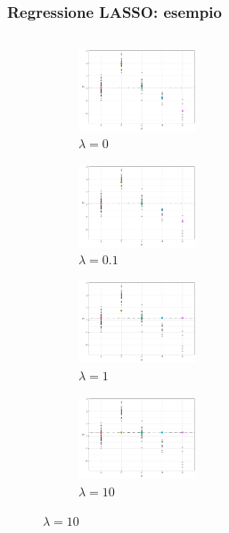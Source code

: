 \documentclass[pdf, aspectratio=169, xcolor=dvipsnames]{beamer}\usepackage[]{graphicx}\usepackage[]{color}
\theoremstyle{definition}
\begin{document}
\begin{frame}
\frametitle{Regressione LASSO: esempio}

\fontsize{9pt}{11pt}\selectfont

\begin{columns}[c]
\begin{column}{0.55\linewidth}
  \begin{figure}
    \centering
    \begin{subfigure}[b]{3cm}
      \centering
      \caption{$\lambda = 0$}
      \includegraphics[width=3.5cm]{_bookdown_files/_main_files/figure-latex/lasso-lambda-1.pdf}
    \end{subfigure}
    \qquad
    \begin{subfigure}[b]{3cm}
      \centering
      \caption{$\lambda = 0.1$}
      \includegraphics[width=3.5cm]{_bookdown_files/_main_files/figure-latex/lasso-lambda-2.pdf}
    \end{subfigure}
    \par\medskip
    \begin{subfigure}[b]{3cm}
      \centering
      \caption{$\lambda = 1$}
      \includegraphics[width=3.5cm]{_bookdown_files/_main_files/figure-latex/lasso-lambda-3.pdf}
    \end{subfigure}
    \qquad
    \begin{subfigure}[b]{3cm}
      \centering
      \caption{$\lambda = 10$}
      \includegraphics[width=3.5cm]{_bookdown_files/_main_files/figure-latex/lasso-lambda-4.pdf}

\end{subfigure}
\end{figure}
\end{column}
\end{columns}
\end{frame}
\end{document}
